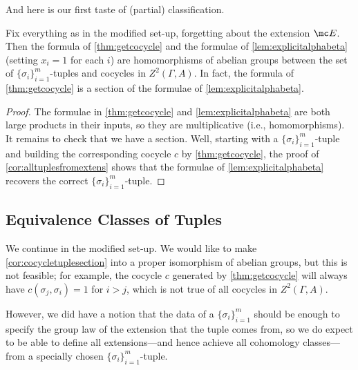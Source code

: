 \documentclass{article}
\numberwithin{equation}{section}
\begin{document}
And here is our first taste of (partial) classification.
\begin{cor} \label{cor:cocycletuplesection}
	Fix everything as in the modified set-up, forgetting about the extension $\mc E$. Then the formula of \autoref{thm:getcocycle} and the formulae of \autoref{lem:explicitalphabeta} (setting $x_i=1$ for each $i$) are homomorphisms of abelian groups between the set of $\{\sigma_i\}_{i=1}^m$-tuples and cocycles in $Z^2(\Gamma,A)$. In fact, the formula of \autoref{thm:getcocycle} is a section of the formulae of \autoref{lem:explicitalphabeta}.
\end{cor}
\begin{proof}
	The formulae in \autoref{thm:getcocycle} and \autoref{lem:explicitalphabeta} are both large products in their inputs, so they are multiplicative (i.e., homomorphisms). It remains to check that we have a section. Well, starting with a $\{\sigma_i\}_{i=1}^m$-tuple and building the corresponding cocycle $c$ by \autoref{thm:getcocycle}, the proof of \autoref{cor:alltuplesfromextens} shows that the formulae of \autoref{lem:explicitalphabeta} recovers the correct $\{\sigma_i\}_{i=1}^m$-tuple.
\end{proof}

\subsection{Equivalence Classes of Tuples}
We continue in the modified set-up. We would like to make \autoref{cor:cocycletuplesection} into a proper isomorphism of abelian groups, but this is not feasible; for example, the cocycle $c$ generated by \autoref{thm:getcocycle} will always have $c(\sigma_j,\sigma_i)=1$ for $i>j$, which is not true of all cocycles in $Z^2(\Gamma,A)$.

However, we did have a notion that the data of a $\{\sigma_i\}_{i=1}^m$ should be enough to specify the group law of the extension that the tuple comes from, so we do expect to be able to define all extensions---and hence achieve all cohomology classes---from a specially chosen $\{\sigma_i\}_{i=1}^m$-tuple.
\end{document}
